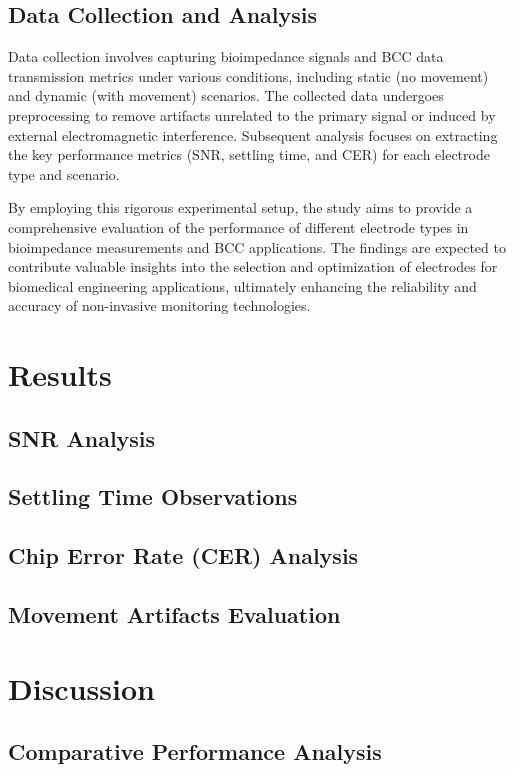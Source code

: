 \documentclass[conference]{IEEEtran}
\begin{document}
\subsection{Data Collection and Analysis}

Data collection involves capturing bioimpedance signals and BCC data transmission metrics under various conditions, including static (no movement) and dynamic (with movement) scenarios. The collected data undergoes preprocessing to remove artifacts unrelated to the primary signal or induced by external electromagnetic interference. Subsequent analysis focuses on extracting the key performance metrics (SNR, settling time, and CER) for each electrode type and scenario.

By employing this rigorous experimental setup, the study aims to provide a comprehensive evaluation of the performance of different electrode types in bioimpedance measurements and BCC applications. The findings are expected to contribute valuable insights into the selection and optimization of electrodes for biomedical engineering applications, ultimately enhancing the reliability and accuracy of non-invasive monitoring technologies.



\section{Results}
\subsection{SNR Analysis}
\subsection{Settling Time Observations}
\subsection{Chip Error Rate (CER) Analysis}
\subsection{Movement Artifacts Evaluation}

\section{Discussion}
\subsection{Comparative Performance Analysis}
\end{document}
